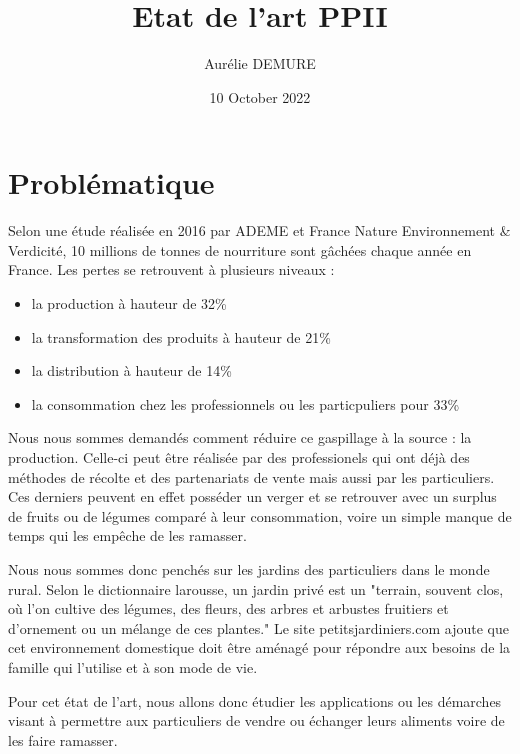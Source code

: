 \documentclass{article}
\title{Etat de l'art PPII}
\author{Aurélie DEMURE}
\date{10 October 2022}
\begin{document}
\maketitle

\section{Problématique}

Selon une étude réalisée en 2016 par ADEME et France Nature Environnement
& Verdicité, 10 millions de tonnes de nourriture sont gâchées chaque
année en France. Les pertes se retrouvent à plusieurs niveaux :
\begin{itemize}
    \item la production à hauteur de 32\%
    \item la transformation des produits à hauteur de 21\%
    \item la distribution à hauteur de 14\%
    \item la consommation chez les professionnels ou les particpuliers 
    pour 33\%
\end{itemize}

Nous nous sommes demandés comment réduire ce gaspillage à la source :
la production.
Celle-ci peut être réalisée par des professionels qui ont déjà des 
méthodes de récolte et des partenariats de vente mais aussi par les
particuliers. Ces derniers peuvent en effet posséder un verger et se
retrouver avec un surplus de fruits ou de légumes comparé à leur 
consommation, voire un simple manque de temps qui les empêche de les
ramasser. 

Nous nous sommes donc penchés sur les jardins des particuliers dans 
le monde rural. Selon le dictionnaire larousse, un jardin privé est un
"terrain, souvent clos, où l'on cultive des légumes, des fleurs, des 
arbres et arbustes fruitiers et d'ornement ou un mélange de ces plantes."
Le site petitsjardiniers.com ajoute que cet environnement domestique
doit être aménagé pour répondre aux besoins de la famille qui l'utilise
et à son mode de vie.

Pour cet état de l'art, nous allons donc étudier les applications ou les
démarches visant à permettre aux particuliers de vendre ou échanger
leurs aliments voire de les faire ramasser.
\end{document}
